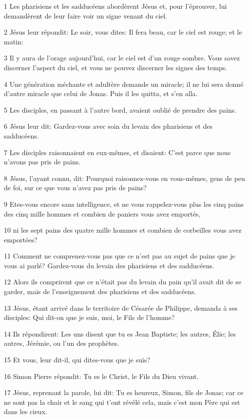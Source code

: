 \par 1 Les pharisiens et les sadducéens abordèrent Jésus et, pour l'éprouver, lui demandèrent de leur faire voir un signe venant du ciel.
\par 2 Jésus leur répondit: Le soir, vous dites: Il fera beau, car le ciel est rouge; et le matin:
\par 3 Il y aura de l'orage aujourd'hui, car le ciel est d'un rouge sombre. Vous savez discerner l'aspect du ciel, et vous ne pouvez discerner les signes des temps.
\par 4 Une génération méchante et adultère demande un miracle; il ne lui sera donné d'autre miracle que celui de Jonas. Puis il les quitta, et s'en alla.
\par 5 Les disciples, en passant à l'autre bord, avaient oublié de prendre des pains.
\par 6 Jésus leur dit: Gardez-vous avec soin du levain des pharisiens et des sadducéens.
\par 7 Les disciples raisonnaient en eux-mêmes, et disaient: C'est parce que nous n'avons pas pris de pains.
\par 8 Jésus, l'ayant connu, dit: Pourquoi raisonnez-vous en vous-mêmes, gens de peu de foi, sur ce que vous n'avez pas pris de pains?
\par 9 Etes-vous encore sans intelligence, et ne vous rappelez-vous plus les cinq pains des cinq mille hommes et combien de paniers vous avez emportés,
\par 10 ni les sept pains des quatre mille hommes et combien de corbeilles vous avez emportées?
\par 11 Comment ne comprenez-vous pas que ce n'est pas au sujet de pains que je vous ai parlé? Gardez-vous du levain des pharisiens et des sadducéens.
\par 12 Alors ils comprirent que ce n'était pas du levain du pain qu'il avait dit de se garder, mais de l'enseignement des pharisiens et des sadducéens.
\par 13 Jésus, étant arrivé dans le territoire de Césarée de Philippe, demanda à ses disciples: Qui dit-on que je suis, moi, le Fils de l'homme?
\par 14 Ils répondirent: Les uns disent que tu es Jean Baptiste; les autres, Élie; les autres, Jérémie, ou l'un des prophètes.
\par 15 Et vous, leur dit-il, qui dites-vous que je suis?
\par 16 Simon Pierre répondit: Tu es le Christ, le Fils du Dieu vivant.
\par 17 Jésus, reprenant la parole, lui dit: Tu es heureux, Simon, fils de Jonas; car ce ne sont pas la chair et le sang qui t'ont révélé cela, mais c'est mon Père qui est dans les cieux.
